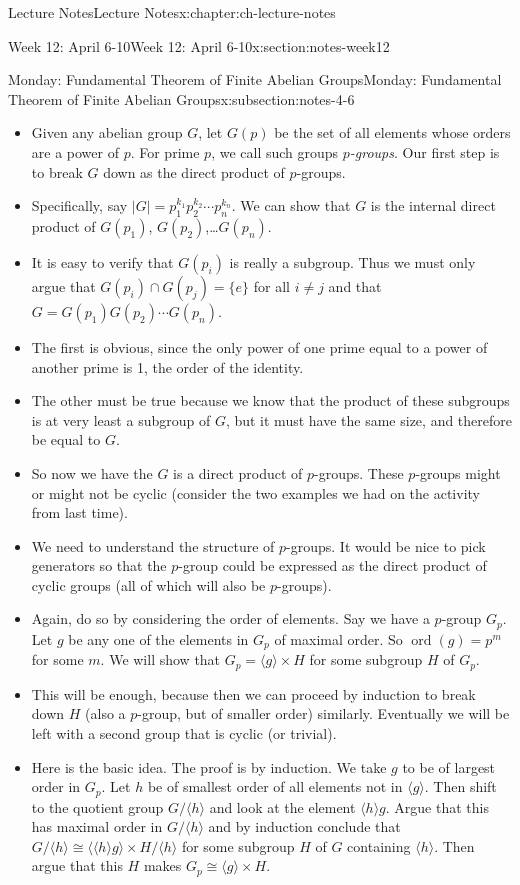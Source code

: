 \documentclass[oneside,11pt,]{book}
\begin{document}
\begin{chapterptx}{Lecture Notes}{}{Lecture Notes}{}{}{x:chapter:ch-lecture-notes}
\begin{sectionptx}{Week 12: April 6-10}{}{Week 12: April 6-10}{}{}{x:section:notes-week12}
\begin{subsectionptx}{Monday: Fundamental Theorem of Finite Abelian Groups}{}{Monday: Fundamental Theorem of Finite Abelian Groups}{}{}{x:subsection:notes-4-6}
\begin{itemize}[label=\textbullet]
\item{}Given any abelian group \(G\), let \(G(p)\) be the set of all elements whose orders are a power of \(p\). For prime \(p\), we call such groups \emph{\(p\)-groups}. Our first step is to break \(G\) down as the direct product of \(p\)-groups.%
\item{}Specifically, say \(|G| = p_1^{k_1}p_2^{k_2}\cdots p_n^{k_n}\). We can show that \(G\) is the internal direct product of \(G(p_1)\), \(G(p_2)\),…\(G(p_n)\).%
\item{}It is easy to verify that \(G(p_i)\) is really a subgroup. Thus we must only argue that \(G(p_i)\cap G(p_j) = \{e\}\) for all \(i \ne j\) and that \(G = G(p_1)G(p_2)\cdots G(p_n)\).%
\item{}The first is obvious, since the only power of one prime equal to a power of another prime is 1, the order of the identity.%
\item{}The other must be true because we know that the product of these subgroups is at very least a subgroup of \(G\), but it must have the same size, and therefore be equal to \(G\).%
\item{}So now we have the \(G\) is a direct product of \(p\)-groups. These \(p\)-groups might or might not be cyclic (consider the two examples we had on the activity from last time).%
\item{}We need to understand the structure of \(p\)-groups. It would be nice to pick generators so that the \(p\)-group could be expressed as the direct product of cyclic groups (all of which will also be \(p\)-groups).%
\item{}Again, do so by considering the order of elements. Say we have a \(p\)-group \(G_p\). Let \(g\) be any one of the elements in \(G_p\) of maximal order. So \(\mathop{\mathrm{ord}}(g) = p^m\) for some \(m\). We will show that \(G_p = \langle g \rangle \times H\) for some subgroup \(H\) of \(G_p\).%
\item{}This will be enough, because then we can proceed by induction to break down \(H\) (also a \(p\)-group, but of smaller order) similarly. Eventually we will be left with a second group that is cyclic (or trivial).%
\item{}Here is the basic idea. The proof is by induction. We take \(g\) to be of largest order in \(G_p\). Let \(h\) be of smallest order of all elements not in \(\langle g\rangle\). Then shift to the quotient group \(G/\langle h\rangle\) and look at the element \(\langle h\rangle g\). Argue that this has maximal order in \(G/\langle h\rangle\) and by induction conclude that \(G/\langle h\rangle \cong \langle \langle h\rangle g\rangle \times H/\langle h\rangle\) for some subgroup \(H\) of \(G\) containing \(\langle h\rangle\). Then argue that this \(H\) makes \(G_p \cong \langle g \rangle \times H\).%

\end{itemize}
\end{subsectionptx}
\end{sectionptx}
\end{chapterptx}
\end{document}
